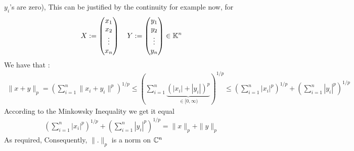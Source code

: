 \begin{enumerate}[(i)]
$y_{i}$'s are zero), This can be justified
by the continuity for example now, for 
\[
X := 
\begin{pmatrix}
	x_1 \\
	x_2 \\
	\vdots  \\
	x_{n} \\
\end{pmatrix}
\quad 
Y := 
\begin{pmatrix}
	y_1 \\
	y_2 \\
	\vdots  \\
	y_{n} \\
\end{pmatrix}
\in \mathbb{K}^{n}
\]
We have that : 
\begin{align*}
\| x+y \| _{p} = 
\left( \sum_{i=1}^{n} 
	\| x_{i} + y_{i} \| ^{p}
\right)^{1/p} \leq 
\left( 
	\sum_{i=1}^{n} 
	\underbrace{
	\left( 
		\left| x_{i} \right| +
		\left| y_{i} \right|
	\right)^{p}
}_{\in  [0,\infty)} 
\right)^{1/p}
\leq 
\left( 
	\sum_{i=1}^{n} 
	\left| x_{i} \right|^{p}
\right)^{1/p} + 
\left( 
	\sum_{i=1}^{n} 
	\left| y_{i} \right|^{p}
\right)^{1/p} 
\end{align*}
According to the Minkowsky Inequality we get
it equal 
\begin{align*}
\left( 
	\sum_{i=1}^{n} 
	\left| x_{i} \right|^{p}
\right)^{1/p} + 
\left( 
	\sum_{i=1}^{n} 
	\left| y_{i} \right|^{p}
\right)^{1/p}  = 
\| x \| _{p} + 
\| y \| _{p}
\end{align*}
As required, Consequently, 
$\| . \| _{p}$  is a norm on $\mathbb{C} ^{n}$ 
\end{enumerate}
